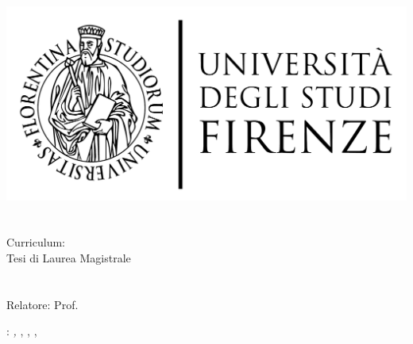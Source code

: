 \begin{titlepage}
	\begin{center}
   	\large
      \hfill
      \vfill
      \begingroup
         \includegraphics[scale=0.15]{logo/LOGO}\\
			\myFaculty \\
			\vspace{0.5cm}
			\myDegree \\ 
			Curriculum: \emph{\myCurriculum}\\
			\vspace{0.5cm}
         \vspace{0.5cm}    
         Tesi di Laurea Magistrale 
      \endgroup 
      \vfill 
      \begingroup
      	\color{Maroon}\spacedallcaps{\myItalianTitle} \\ $\ $\\
      	\spacedallcaps{\myEnglishTitle} \\ 	
	\bigskip
      \endgroup
      \spacedlowsmallcaps{\myName}
      \vfill 
      \vfill
      Relatore: Prof. \emph{\myProf}\\
      \vfill
      \vfill
      \myTime
      \vfill                      
	\end{center}        
\end{titlepage}   
   \newpage
	\thispagestyle{empty}
	\hfill
	\vfill
	\noindent\myName: 
	\textit{\myItalianTitle,} 
	\myDegree, \mycopyright, \myUni, \myTime
